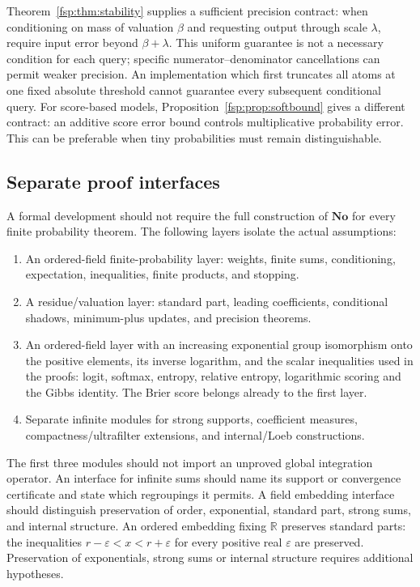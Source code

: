 \documentclass[11pt,a4paper]{article}
\numberwithin{equation}{section}
\theoremstyle{definition}
\theoremstyle{remark}
\newcommand{\R}{\mathbb R}
\newcommand{\No}{\mathbf{No}}
\begin{document}
Theorem~\ref{fsp:thm:stability} supplies a sufficient precision contract:
when conditioning on mass of valuation $\beta$ and requesting output through
scale $\lambda$, require input error beyond $\beta+\lambda$.
This uniform guarantee is not a necessary condition for each query;
specific numerator--denominator cancellations can permit weaker precision.
An implementation which first truncates all atoms at one fixed absolute
threshold cannot guarantee every subsequent conditional query. For
score-based models, Proposition~\ref{fsp:prop:softbound} gives a different
contract: an additive score error bound controls multiplicative
probability error. This can be preferable when tiny probabilities must
remain distinguishable.

\subsection{Separate proof interfaces}

A formal development should not require the full construction of $\No$
for every finite probability theorem. The following layers isolate the
actual assumptions:
\begin{enumerate}
\item An ordered-field finite-probability layer: weights, finite sums,
conditioning, expectation, inequalities, finite products, and stopping.
\item A residue/valuation layer: standard part, leading coefficients,
conditional shadows, minimum-plus updates, and precision theorems.
\item An ordered-field layer with an increasing exponential group
isomorphism onto the positive elements, its inverse logarithm, and the
scalar inequalities used in the proofs: logit, softmax, entropy, relative
entropy, logarithmic scoring and the Gibbs identity. The Brier score
belongs already to the first layer.
\item Separate infinite modules for strong supports, coefficient measures,
compactness/ultrafilter extensions, and internal/Loeb constructions.
\end{enumerate}
The first three modules should not import an unproved global integration
operator. An interface for infinite sums should name its support or
convergence certificate and state which regroupings it permits.
A field embedding interface should distinguish preservation of order,
exponential, standard part, strong sums, and internal structure. An ordered
embedding fixing $\R$ preserves standard parts: the inequalities
$r-\varepsilon<x<r+\varepsilon$ for every positive real $\varepsilon$
are preserved. Preservation of exponentials, strong sums or internal
structure requires additional hypotheses.
\end{document}
